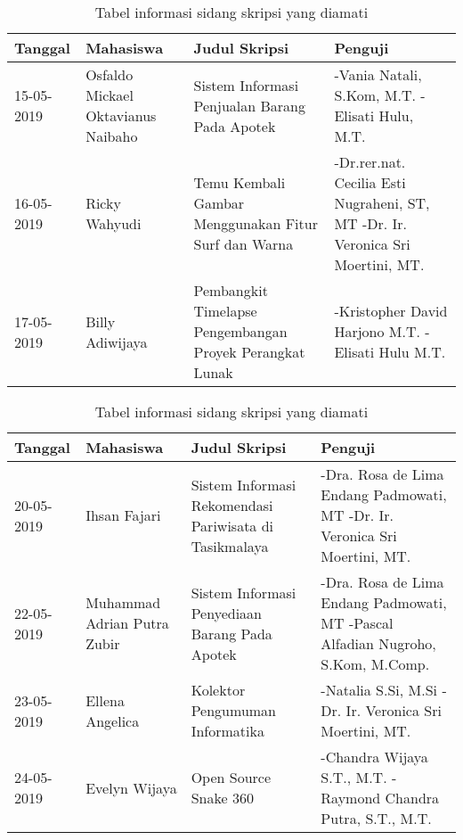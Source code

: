 \begin{table}[H]
	\caption {Tabel informasi sidang skripsi yang diamati} \label{tab:pengamatan_sidang1}
	\begin{center}
		\begin{tabular}{|p{2 cm}|>{\raggedright} p{3.5 cm}| p{4.5 cm}| p{4.5 cm}|}
		\hline
		Tanggal & Mahasiswa & Judul Skripsi & Penguji \\ 
		\hline
		15-05-2019 & Osfaldo Mickael Oktavianus Naibaho & Sistem Informasi Penjualan Barang Pada Apotek & -Vania Natali, S.Kom, M.T. \newline -Elisati Hulu, M.T. \newline \\ 
		\hline
		16-05-2019 & Ricky Wahyudi & Temu Kembali Gambar Menggunakan Fitur Surf dan Warna & -Dr.rer.nat. Cecilia Esti Nugraheni, ST, MT \newline -Dr. Ir. Veronica Sri Moertini, MT. \newline \\ 
		\hline 
		17-05-2019 & Billy Adiwijaya & Pembangkit Timelapse Pengembangan Proyek Perangkat Lunak & -Kristopher David Harjono M.T. \newline -Elisati Hulu M.T. \newline \\ 
		\hline 
		\end{tabular}
	\end{center}
\end{table}

\begin{table}[H]
	\caption {Tabel informasi sidang skripsi yang diamati} \label{tab:pengamatan_sidang2}
	\begin{center}
		\begin{tabular}{|p{2 cm}|>{\raggedright} p{3.5 cm}| p{4.5 cm}| p{4.5 cm}|}
		\hline
		Tanggal & Mahasiswa & Judul Skripsi & Penguji \\ 
		\hline
		20-05-2019 & Ihsan Fajari & Sistem Informasi Rekomendasi Pariwisata di Tasikmalaya & -Dra. Rosa de Lima Endang Padmowati, MT \newline -Dr. Ir. Veronica Sri Moertini, MT. \newline \\ 
		\hline 
		22-05-2019 & Muhammad Adrian Putra Zubir & Sistem Informasi Penyediaan Barang Pada Apotek & -Dra. Rosa de Lima Endang Padmowati, MT \newline -Pascal Alfadian Nugroho, S.Kom, M.Comp. \newline \\ 
		\hline 
		23-05-2019 & Ellena Angelica & Kolektor Pengumuman Informatika & -Natalia S.Si, M.Si \newline -Dr. Ir. Veronica Sri Moertini, MT. \newline \\ 
		\hline 
		24-05-2019 & Evelyn Wijaya & Open Source Snake 360 & -Chandra Wijaya S.T., M.T. \newline -Raymond Chandra Putra, S.T., M.T. \newline \\ 
		\hline 
		\end{tabular}
	\end{center}
\end{table}

